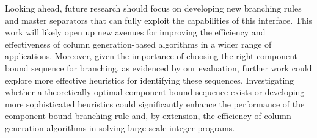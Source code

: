 Looking ahead, future research should focus on developing new branching rules and master separators that can fully exploit the capabilities of this interface. This work will likely open up new avenues for improving the efficiency and effectiveness of column generation-based algorithms in a wider range of applications. Moreover, given the importance of choosing the right component bound sequence for branching, as evidenced by our evaluation, further work could explore more effective heuristics for identifying these sequences. Investigating whether a theoretically optimal component bound sequence exists or developing more sophisticated heuristics could significantly enhance the performance of the component bound branching rule and, by extension, the efficiency of column generation algorithms in solving large-scale integer programs.
